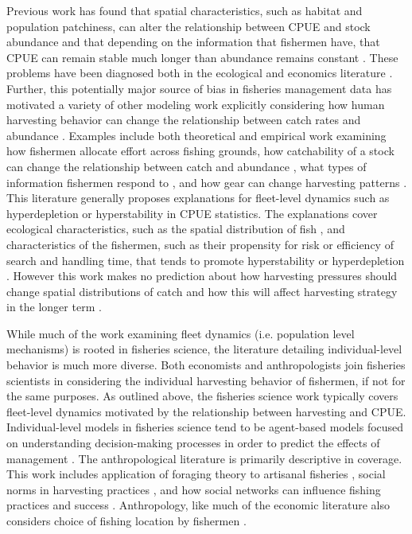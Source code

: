 \documentclass[12pt,a4paper]{report}
\begin{document}
Previous work has found that spatial characteristics, such as habitat and population patchiness, can alter the relationship between CPUE and stock abundance \citep{Stobartetal:2012, Walters:2003} and that depending on the information that fishermen have, that CPUE can remain stable much longer than abundance remains constant \citep{@Harleyetal:2001, Branchetal:2006}. These problems have been diagnosed both in the ecological and economics literature \citep{CookeBeddington:1984}. Further, this potentially major source of bias in fisheries management data has motivated a variety of other modeling work explicitly considering how human harvesting behavior can change the relationship between catch rates and abundance \citep{Hilborn:1985, DreyfusLeonKleiber:2001, HilbornWalters:1992}. Examples include both theoretical  and empirical work \citep{MangelClark:1983, HilbornLedbetter:1979} examining how fishermen allocate effort across fishing grounds, how catchability of a stock can change the relationship between catch and abundance \citep{ClarkMangel:1979}, what types of information fishermen respond to \citep{Vignaux:1996}, and how gear can change harvesting patterns \citep{Gaertneretal:1999}. This literature generally proposes explanations for fleet-level dynamics such as hyperdepletion or hyperstability in CPUE statistics. The explanations cover ecological characteristics, such as the spatial distribution of fish \citep{Hancocketal:1995}, and characteristics of the fishermen, such as their propensity for risk or efficiency of search and handling time, that tends to promote hyperstability or hyperdepletion \citep{Mahevasetal:2011, HilbornWalters:1992}. However this work makes no prediction about how harvesting pressures should change spatial distributions of catch and how this will affect harvesting strategy in the longer term \citep{HilbornWalters:1987}. 

While much of the work examining fleet dynamics (i.e. population level mechanisms) is rooted in fisheries science, the literature detailing individual-level behavior is much more diverse. Both economists and anthropologists join fisheries scientists in considering the individual harvesting behavior of fishermen, if not for the same purposes. As outlined above, the fisheries science work typically covers fleet-level dynamics motivated by the relationship between harvesting and CPUE. Individual-level models in fisheries science tend to be agent-based models focused on understanding decision-making processes in order to predict the effects of management \citep{DreyfusLeon:1999, SoulieThebaud:2006, GaertnerDreyfusLeon:2004}. The anthropological literature is primarily descriptive in coverage. This work includes application of foraging theory to artisanal fisheries \citep{Aswani:1998, Begossi:1992, Abernethyetal:2007, Daw:2008}, social norms in harvesting practices \citep{Acheson:1975, HollandSutinen:2000}, and how social networks can influence fishing practices and success \citep{DurrenbergePalsson:nd, PalssonDurrenberger:1982, HilbornLedbetter:1979, CronaBodin:2006}. Anthropology, like much of the economic literature also considers choice of fishing location by fishermen \citep{Gatewood:1983, Orth:1987, Gezelius:2007}. 
\end{document}
